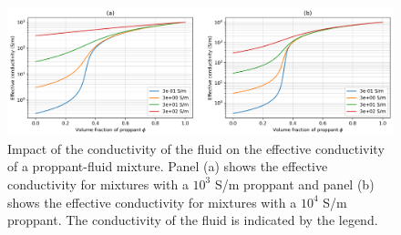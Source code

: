 \begin{figure}
    \begin{center}
    \includegraphics[width=\textwidth]{figures/phys_prop_model/emt_fluid.png}
    \end{center}
\caption{
    Impact of the conductivity of the fluid on the effective conductivity of a proppant-fluid mixture.
    Panel (a) shows the effective conductivity for mixtures with a $10^3$ S/m proppant and panel (b) shows the effective
    conductivity for mixtures with a $10^4$ S/m proppant. The conductivity of the fluid is indicated by the legend.
}
\label{fig:emt_fluid}
\end{figure}
